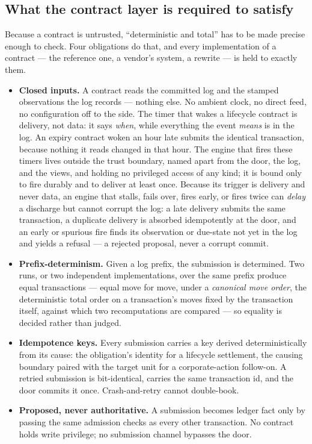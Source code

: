 \subsection{What the contract layer is required to satisfy}

Because a contract is untrusted, ``deterministic and total'' has to be made
precise enough to check. Four obligations do that, and every implementation of a
contract --- the reference one, a vendor's system, a rewrite --- is held to exactly
them.

\begin{itemize}[leftmargin=1.5em]
\item \textbf{Closed inputs.} A contract reads the committed log and the stamped
observations the log records --- nothing else. No ambient clock, no direct feed, no
configuration off to the side. The timer that wakes a lifecycle contract is
delivery, not data: it says \emph{when}, while everything the event \emph{means}
is in the log. An expiry contract woken an hour late submits the identical
transaction, because nothing it reads changed in that hour. The engine that fires
these timers lives outside the trust boundary, named apart from the door, the log,
and the views, and holding no privileged access of any kind; it is bound only to
fire durably and to deliver at least once. Because its trigger is delivery and never
data, an engine that stalls, fails over, fires early, or fires twice can \emph{delay}
a discharge but cannot corrupt the log: a late delivery submits the same transaction,
a duplicate delivery is absorbed idempotently at the door, and an early or spurious
fire finds its observation or due-state not yet in the log and yields a refusal --- a
rejected proposal, never a corrupt commit.
\item \textbf{Prefix-determinism.} Given a log prefix, the submission is
determined. Two runs, or two independent implementations, over the same prefix
produce equal transactions --- equal move for move, under a \emph{canonical move
order}, the deterministic total order on a transaction's moves fixed by the
transaction itself, against which two recomputations are compared --- so equality is
decided rather than judged.
\item \textbf{Idempotence keys.} Every submission carries a key derived
deterministically from its cause: the obligation's identity for a lifecycle
settlement, the causing boundary paired with the target unit for a corporate-action
follow-on. A retried submission is bit-identical, carries the same transaction id,
and the door commits it once. Crash-and-retry cannot double-book.
\item \textbf{Proposed, never authoritative.} A submission becomes ledger fact
only by passing the same admission checks as every other transaction. No contract
holds write privilege; no submission channel bypasses the door.
\end{itemize}

